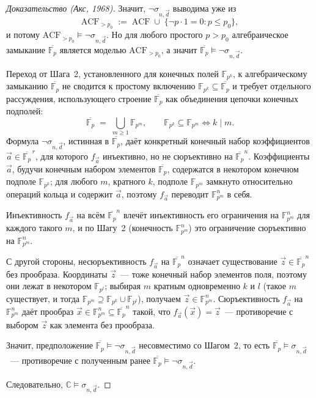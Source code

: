 \documentclass[12pt, a4paper]{article}
\theoremstyle{plain}
\theoremstyle{definition}
\renewcommand{\models}{\vDash}
\begin{document}
\begin{proof}[Доказательство (Акс, 1968)]
Значит, $\neg\sigma_{n,\vec d}$ выводима уже из
\[
  \mathrm{ACF}_{>p_0} \;:=\; \mathrm{ACF} \;\cup\;
  \{\neg p \cdot 1 = 0 : p \le p_0\},
\]
и потому $\mathrm{ACF}_{>p_0} \models \neg\sigma_{n,\vec d}$.
Но для любого простого $p > p_0$ алгебраическое замыкание $\overline{\mathbb{F}_p}$
является моделью $\mathrm{ACF}_{>p_0}$, а значит
$\overline{\mathbb{F}_p} \models \neg\sigma_{n,\vec d}$.

Переход от Шага~2, установленного для конечных полей $\mathbb{F}_{p^k}$,
к алгебраическому замыканию $\overline{\mathbb{F}_p}$ не сводится к простому
включению $\mathbb{F}_{p^k} \subseteq \overline{\mathbb{F}_p}$ и требует
отдельного рассуждения, использующего строение $\overline{\mathbb{F}_p}$ как
объединения цепочки конечных подполей:
\[
  \overline{\mathbb{F}_p} \;=\; \bigcup_{m \ge 1} \mathbb{F}_{p^m},
  \qquad
  \mathbb{F}_{p^k} \subseteq \mathbb{F}_{p^m} \iff k \mid m.
\]
Формула $\neg\sigma_{n,\vec d}$, истинная в $\overline{\mathbb{F}_p}$, даёт
конкретный конечный набор коэффициентов $\vec a \in \overline{\mathbb{F}_p}^{\,r}$,
для которого $f_{\vec a}$ инъективно, но не сюръективно на
$\overline{\mathbb{F}_p}^n$. Коэффициенты $\vec a$, будучи конечным набором
элементов $\overline{\mathbb{F}_p}$, содержатся в некотором конечном подполе
$\mathbb{F}_{p^k}$; для любого $m$, кратного $k$, подполе $\mathbb{F}_{p^m}$
замкнуто относительно операций кольца и содержит $\vec a$, поэтому
$f_{\vec a}$ переводит $\mathbb{F}_{p^m}^n$ в себя.

Инъективность $f_{\vec a}$ на всём $\overline{\mathbb{F}_p}^n$ влечёт
инъективность его ограничения на $\mathbb{F}_{p^m}^n$ для каждого такого $m$,
и по Шагу~2 (конечность $\mathbb{F}_{p^m}^n$) это ограничение сюръективно
на $\mathbb{F}_{p^m}^n$.

С другой стороны, несюръективность $f_{\vec a}$ на $\overline{\mathbb{F}_p}^n$
означает существование $\vec z \in \overline{\mathbb{F}_p}^n$ без прообраза.
Координаты $\vec z$~--- тоже конечный набор элементов поля, поэтому они
лежат в некотором $\mathbb{F}_{p^l}$; выбирая $m$ кратным одновременно $k$
и $l$ (такое $m$ существует, и тогда $\mathbb{F}_{p^m} \supseteq
\mathbb{F}_{p^k} \cup \mathbb{F}_{p^l}$), получаем $\vec z \in \mathbb{F}_{p^m}^n$.
Сюръективность $f_{\vec a}$ на $\mathbb{F}_{p^m}^n$ даёт прообраз
$\vec x \in \mathbb{F}_{p^m}^n \subseteq \overline{\mathbb{F}_p}^n$ такой, что
$f_{\vec a}(\vec x) = \vec z$~--- противоречие с выбором $\vec z$ как элемента
без прообраза.

Значит, предположение $\overline{\mathbb{F}_p} \models \neg\sigma_{n,\vec d}$
несовместимо со Шагом~2, то есть $\overline{\mathbb{F}_p} \models \sigma_{n,\vec d}$~---
противоречие с полученным ранее $\overline{\mathbb{F}_p} \models \neg\sigma_{n,\vec d}$.

Следовательно, $\mathbb{C} \models \sigma_{n,\vec d}$.
\end{proof}
\end{document}
